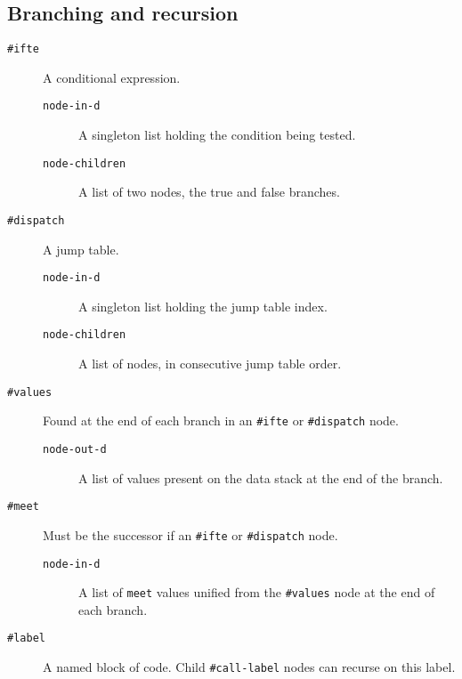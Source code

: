 \documentclass{book}
\begin{document}
\subsection{Branching and recursion}

\begin{description}

\item[\texttt{\#ifte}] A conditional expression.

\begin{description}
\item[\texttt{node-in-d}]A singleton list holding the condition being tested.\\
\item[\texttt{node-children}]A list of two nodes, the true and false branches.
\end{description}

\item[\texttt{\#dispatch}] A jump table.

\begin{description}
\item[\texttt{node-in-d}]A singleton list holding the jump table index.\\
\item[\texttt{node-children}]A list of nodes, in consecutive jump table order.
\end{description}

\item[\texttt{\#values}] Found at the end of each branch in an \verb|#ifte| or \verb|#dispatch| node.

\begin{description}
\item[\texttt{node-out-d}]A list of values present on the data stack at the end of the branch.\\
\end{description}

\item[\texttt{\#meet}] Must be the successor if an \verb|#ifte| or \verb|#dispatch| node.

\begin{description}
\item[\texttt{node-in-d}]A list of \verb|meet| values unified from the \verb|#values| node at the end of each branch.\\
\end{description}

\item[\texttt{\#label}] A named block of code. Child \verb|#call-label| nodes can recurse on this label.


\end{description}
\end{document}
